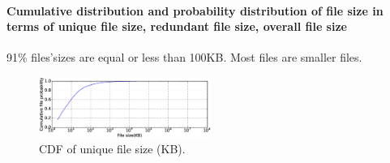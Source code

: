 \paragraph{Cumulative distribution and probability distribution of file size in terms of unique file size, redundant file size, overall file size}

91\% files'sizes are equal or less than 100KB. Most files are smaller files.

\begin{figure}
	\centering
	\includegraphics[width=0.5\textwidth]{graphs/File_size-KB.eps}
	\caption{CDF of unique file size (KB).
	}
	\label{fig:file_size}
\end{figure}

%
%
%
%
%
%
%
%

